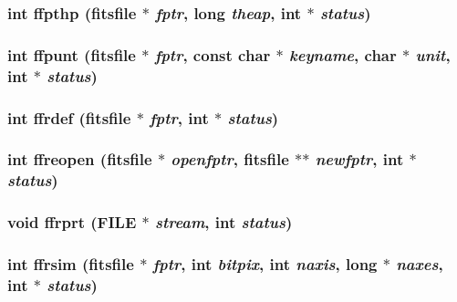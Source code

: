 \subsubsection{\setlength{\rightskip}{0pt plus 5cm}int ffpthp (\bf{fitsfile} $\ast$ {\em fptr}, long {\em theap}, int $\ast$ {\em status})}\label{fitsio_8h_d937788b718144227ca0e56f98b7d2ed}


\subsubsection{\setlength{\rightskip}{0pt plus 5cm}int ffpunt (\bf{fitsfile} $\ast$ {\em fptr}, const char $\ast$ {\em keyname}, char $\ast$ {\em unit}, int $\ast$ {\em status})}\label{fitsio_8h_67dc8b0a8bbcf6abbd2b529763a4ea17}


\subsubsection{\setlength{\rightskip}{0pt plus 5cm}int ffrdef (\bf{fitsfile} $\ast$ {\em fptr}, int $\ast$ {\em status})}\label{fitsio_8h_4b27e85305907801c1c6161bee2bd45e}


\subsubsection{\setlength{\rightskip}{0pt plus 5cm}int ffreopen (\bf{fitsfile} $\ast$ {\em openfptr}, \bf{fitsfile} $\ast$$\ast$ {\em newfptr}, int $\ast$ {\em status})}\label{fitsio_8h_0f52024e2521bf029d2bf87a365e9e39}


\subsubsection{\setlength{\rightskip}{0pt plus 5cm}void ffrprt (FILE $\ast$ {\em stream}, int {\em status})}\label{fitsio_8h_ddc25a8219909329a0d3aed010d854ee}


\subsubsection{\setlength{\rightskip}{0pt plus 5cm}int ffrsim (\bf{fitsfile} $\ast$ {\em fptr}, int {\em bitpix}, int {\em naxis}, long $\ast$ {\em naxes}, int $\ast$ {\em status})}\label{fitsio_8h_41eea6b73ae062d053678b27edcdb3ce}


